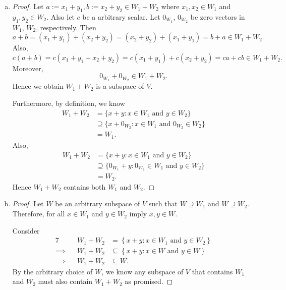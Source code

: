\begin{Exercise}
	\begin{enumerate}[(a)]
		\item
		\begin{proof}
			Let $a := x_1+y_1, b := x_2+y_2\in W_1+W_2$ where $x_1,x_2\in W_1$ and $y_1,y_2\in W_2$. Also let $c$ be a arbitrary scalar. Let $0_{W_1}$, $0_{W_2}$ be zero vectors in $W_1$, $W_2$, respectively. Then
			$$
			a+b
			= (x_1+y_1) + (x_2+y_2)
			= (x_2+y_2) + (x_1+y_1)
			= b+a \in W_1+W_2.
			$$
			Also,
			$$
			c (a+b)
			= c (x_1+y_1+x_2+y_2)
			= c (x_1+y_1) + c(x_2+y_2)
			= c a + c b \in W_1+W_2.
			$$
			Moreover,
			$$
			0_{W_1} + 0_{W_2} \in W_1+W_2.
			$$
			Hence we obtain $W_1+W_2$ is a subspace of $V$.
			
			Furthermore, by definition, we know
			\begin{align*}
				W_1+W_2
				&= \{x+y:x\in W_1\text{ and }y\in W_2\} \\
				&\supseteq \{x+0_{W_2}:x\in W_1\text{ and } 0_{W_2}\in W_2\} \\
				&= W_1.
			\end{align*}
			Also,
			\begin{align*}
				W_1+W_2
				&= \{x+y:x\in W_1\text{ and }y\in W_2\} \\
				&\supseteq \{0_{W_1}+y:0_{W_1}\in W_1\text{ and } y\in W_2\} \\
				&= W_2.
			\end{align*}
			Hence $W_1+W_2$ contains both $W_1$ and $W_2$.
		\end{proof}
		
		\item 
		\begin{proof}
			Let $W$ be an arbitrary subspace of $V$ such that $W\supseteq W_1$ and $W\supseteq W_2$. Therefore, for all $x\in W_1$ and $y\in W_2$ imply $x,y\in W$.
			
			Consider
			\begin{alignat*}{7}
				\quad&& W_1+W_2 &= \left\{x+y:x\in W_1\text{ and }y\in W_2\right\} \\
				\implies&& W_1+W_2 &\subseteq \left\{x+y:x\in W\text{ and }y\in W\right\} \\
				\implies&& W_1+W_2 &\subseteq W.
			\end{alignat*}
			By the arbitrary choice of $W$, we know any subspace of $V$ that contains $W_1$ and $W_2$ must also contain $W_1+W_2$ as promised.
		\end{proof}
	\end{enumerate}
\end{Exercise}